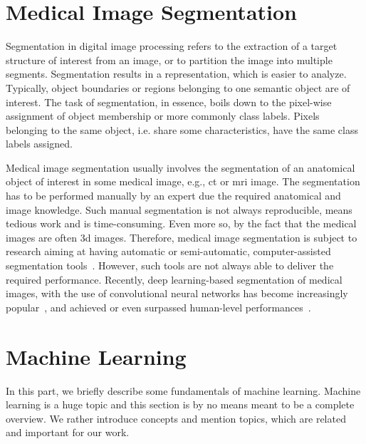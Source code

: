 \section{Medical Image Segmentation} \label{sec:intro_mia} %
Segmentation in digital image processing refers to the extraction of a target structure of interest from an image, or to partition the image into multiple segments. Segmentation results in a representation, which is easier to analyze. Typically, object boundaries or regions belonging to one semantic object are of interest. The task of segmentation, in essence, boils down to the pixel-wise assignment of object membership or more commonly class labels. Pixels belonging to the same object, i.e. share some characteristics, have the same class labels assigned.

Medical image segmentation usually involves the segmentation of an anatomical object of interest in some medical image, e.g., \gls{ct} or \gls{mri} image. The segmentation has to be performed manually by an expert due the required anatomical and image knowledge. Such manual segmentation is not always reproducible, means tedious work and is time-consuming. Even more so, by the fact that the medical images are often \gls{3d} images. Therefore, medical image segmentation is subject to research aiming at having automatic or semi-automatic, computer-assisted segmentation tools~\cite{doi:10.1146/annurev.bioeng.2.1.315,doi:10.1080/10255840903131878}. However, such tools are not always able to deliver the required performance. Recently, deep learning-based segmentation of medical images, with the use of convolutional neural networks has become increasingly popular~\cite{Ronneberger2015U-Net:Segmentation,Tetteh2018DeepVesselNet:Volumes,Cicek20163DAnnotation,Baumgartner2017AnSegmentation,Meng2017TrackingNetwork,Milletari2016V-Net:Segmentation,BalsigerContext-awareNeurography,Kayalibay2017CNN-basedData}, and achieved or even surpassed human-level performances~\cite{He2014DelvingClassification}.

\section{Machine Learning} \label{sec:intro_mlearn} %
In this part, we briefly describe some fundamentals of machine learning. Machine learning is a huge topic and this section is by no means meant to be a complete overview. We rather introduce concepts and mention topics, which are related and important for our work.


